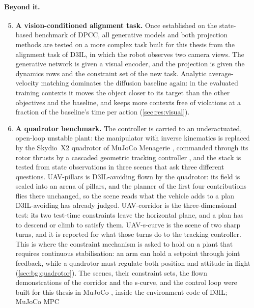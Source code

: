 \documentclass[headsepline,footsepline,footinclude=false,oneside,fontsize=11pt,paper=a4,listof=totoc,bibliography=totoc]{scrbook}
\theoremstyle{definition}
\theoremstyle{plain}
\theoremstyle{remark}
\begin{document}
\paragraph{Beyond it.}
\begin{enumerate}
  \setcounter{enumi}{4}
  \item \textbf{A vision-conditioned alignment task.} Once established on the state-based benchmark
    of \ac{DPCC}, all generative models and both projection methods are tested on a more complex
    task built for this thesis from the alignment task of D3IL, in which the robot observes two camera
    views. The generative network is given a visual encoder, and the projection is given the dynamics
    rows and the constraint set of the new task.
    Analytic average-velocity matching dominates the diffusion baseline again: in the evaluated
    training contexts it moves the object closer to its target than the other objectives and the
    baseline, and keeps more contexts free of violations at a fraction of the baseline's time per
    action (\autoref{sec:res:visual}).
  \item \textbf{A quadrotor benchmark.} The controller is carried to an underactuated, open-loop
    unstable plant: the manipulator with inverse kinematics is replaced by the Skydio~X2 quadrotor of
    MuJoCo Menagerie \parencite{zakka2022menagerie}, commanded through its rotor thrusts by a cascaded
    geometric tracking controller \parencite{lee2010geometric}, and the stack is tested from state
    observations in three scenes that ask three different questions. UAV-pillars is
    D3IL-avoiding flown by the quadrotor: its field is scaled into an arena of pillars, and
    the planner of the first four contributions flies there unchanged, so the scene reads what the
    vehicle adds to a plan D3IL-avoiding has already judged. UAV-corridor is the three-dimensional test:
    its two test-time constraints leave the horizontal plane, and a plan has to descend or climb to
    satisfy them. UAV-s-curve is the scene of two sharp turns, and it is reported for what those turns
    do to the tracking controller. This is where the constraint mechanism is asked to hold on a plant
    that requires continuous stabilisation: an arm can hold a setpoint through joint feedback, while
    a quadrotor must regulate both position and attitude in flight
    (\autoref{sec:bg:quadrotor}). The scenes, their constraint sets, the flown demonstrations of the
    corridor and the s-curve, and the control loop were built for this thesis in MuJoCo
    \parencite{todorov2012mujoco}, inside the environment code of D3IL; MuJoCo MPC

\end{enumerate}
\end{document}
